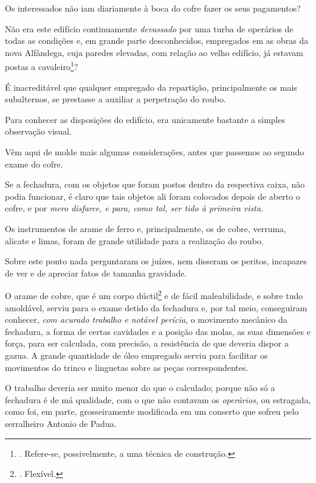 Os interessados não iam diariamente à boca do cofre fazer os seus
pagamentos?

Não era este edifício continuamente \emph{devassado} por uma turba de
operários de todas as condições e, em grande parte desconhecidos,
empregados em as obras da nova Alfândega, cuja paredes elevadas, com
relação ao velho edifício, já estavam postas a cavaleiro\footnote{.
  Refere-se, possivelmente, a uma técnica de construção.}?

É inacreditável que qualquer empregado da repartição, principalmente os
mais subalternos, se prestasse a auxiliar a perpetração do roubo.

Para conhecer as disposições do edifício, era unicamente bastante a
simples observação visual.

Vêm aqui de molde mais algumas considerações, antes que passemos ao
segundo exame do cofre.

Se a fechadura, com os objetos que foram postos dentro da respectiva
caixa, não podia funcionar, é claro que tais objetos ali foram colocados
depois de aberto o cofre, e por \emph{mero disfarce, e para, como tal,
ser tido à primeira vista}.

Os instrumentos de arame de ferro e, principalmente, os de cobre,
verruma, alicate e limas, foram de grande utilidade para a realização do
roubo.

Sobre este ponto nada perguntaram os juízes, nem disseram os peritos,
incapazes de ver e de apreciar fatos de tamanha gravidade.

O arame de cobre, que é um corpo dúctil\footnote{. Flexível.} e de fácil
maleabilidade, e sobre tudo amoldável, serviu para o exame detido da
fechadura e, por tal meio, conseguiram conhecer, \emph{com acurado
trabalho e notável perícia}, o movimento mecânico da fechadura, a forma
de certas cavidades e a posição das molas, as suas dimensões e força,
para ser calculada, com precisão, a resistência de que deveria dispor a
gazua. A grande quantidade de óleo empregado serviu para facilitar os
movimentos do trinco e linguetas sobre as peças correspondentes.

O trabalho deveria ser muito menor do que o calculado; porque não só a
fechadura é de má qualidade, com o que não contavam os \emph{operários},
ou estragada, como foi, em parte, grosseiramente modificada em um
conserto que sofreu pelo serralheiro Antonio de Padua.

